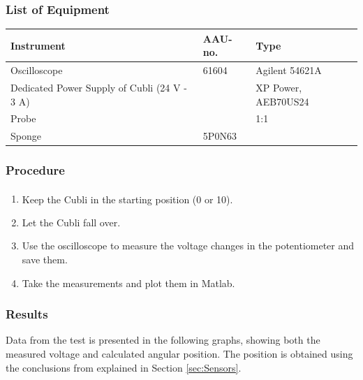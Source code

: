 \subsubsection{List of Equipment}
\begin{table}[H]
	\begin{tabular}{|l|l|p{4.3cm}|}
		\hline%
		\textbf{Instrument}                        &  \textbf{AAU-no.}  &  \textbf{Type}       \\
		\hline%
		Oscilloscope                              &  61604             &  Agilent 54621A		  \\
		\hline%
		Dedicated Power Supply of Cubli \small{(24 V - 3 A)} &               &  XP Power, AEB70US24 \\
		\hline%
		Probe                &             &          1:1   \\
		\hline%
		Sponge               & 5P0N63             &              \\
		\hline%
	\end{tabular}
\end{table}

\subsubsection{Procedure}
\begin{enumerate}
	\item Keep the Cubli in the starting position (\si{0^\circ} or \si{10^\circ}).
	\item Let the Cubli fall over.
	\item Use the oscilloscope to measure the voltage changes in the potentiometer and save them.
	\item Take the measurements and plot them in Matlab.
\end{enumerate}

\subsubsection{Results}
Data from the test is presented in the following graphs, showing both the measured voltage and calculated angular position. The position is obtained using the conclusions from  explained in Section \ref{sec:Sensors}.

